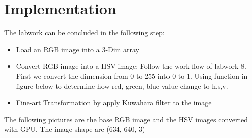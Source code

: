 \documentclass{article}
\begin{document}
\section{Implementation}
The labwork can be concluded in the following step:
\begin{itemize}
    \item Load an RGB image into a 3-Dim array
    \item Convert RGB image into a HSV image: Follow the work flow of labwork 8. First we convert the dimension from 0 to 255 into 0 to 1. Using function in figure below to determine how red, green, blue value change to h,s,v.
    \item Fine-art Transformation by apply Kuwahara filter to the image
\end{itemize}

\begin{figure}[H]
\end{figure}

The following pictures are the base RGB image and the HSV images converted with GPU. The image shape are (634, 640, 3)
\end{document}
